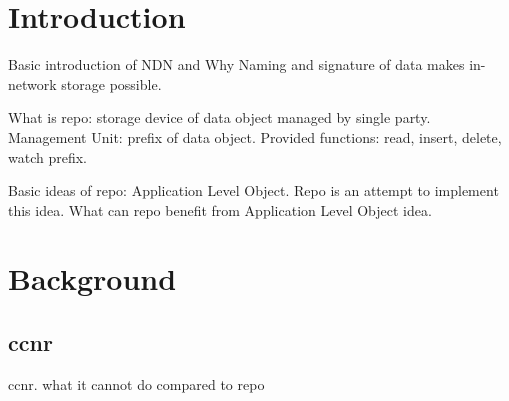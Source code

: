 \documentclass[conference]{IEEEtran}
\begin{document}




\maketitle


\begin{abstract}

\end{abstract}





%
\IEEEpeerreviewmaketitle

\section{Introduction}
Basic introduction of NDN and Why Naming and signature of data makes in-network storage possible.

What is repo: storage device of data object managed by single party. Management Unit: prefix of data object. Provided functions: read, insert, delete, watch prefix.

Basic ideas of repo: Application Level Object. Repo is an attempt to implement this idea. What can repo benefit from Application Level Object idea.

\section{Background}
\subsection{ccnr}
ccnr. what it cannot do compared to repo
\end{document}
